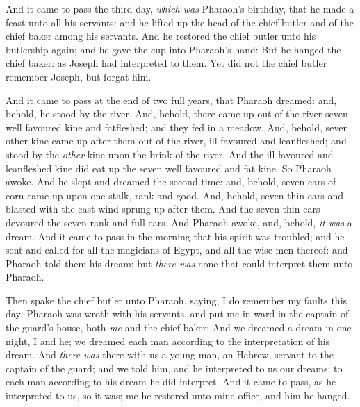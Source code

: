 \documentclass[11pt,letterpaper,oneside]{memoir}
\begin{document}
And it came to pass the third day, \emph{which was} Pharaoh's birthday,
that he made a feast unto all his servants: and he lifted up the head of
the chief butler and of the chief baker among his servants. And he
restored the chief butler unto his butlership again; and he gave the cup
into Pharaoh's hand: But he hanged the chief baker: as Joseph had
interpreted to them. Yet did not the chief butler remember Joseph, but
forgat him.

And it came to pass at the end of two full years, that Pharaoh dreamed:
and, behold, he stood by the river. And, behold, there came up out of
the river seven well favoured kine and fatfleshed; and they fed in a
meadow. And, behold, seven other kine came up after them out of the
river, ill favoured and leanfleshed; and stood by the \emph{other} kine
upon the brink of the river. And the ill favoured and leanfleshed kine
did eat up the seven well favoured and fat kine. So Pharaoh awoke. And
he slept and dreamed the second time: and, behold, seven ears of corn
came up upon one stalk, rank and good. And, behold, seven thin ears and
blasted with the east wind sprung up after them. And the seven thin ears
devoured the seven rank and full ears. And Pharaoh awoke, and, behold,
\emph{it was} a dream. And it came to pass in the morning that his
spirit was troubled; and he sent and called for all the magicians of
Egypt, and all the wise men thereof: and Pharaoh told them his dream;
but \emph{there was} none that could interpret them unto Pharaoh.

Then spake the chief butler unto Pharaoh, saying, I do remember my
faults this day: Pharaoh was wroth with his servants, and put me in ward
in the captain of the guard's house, both \emph{me} and the chief baker:
And we dreamed a dream in one night, I and he; we dreamed each man
according to the interpretation of his dream. And \emph{there was} there
with us a young man, an Hebrew, servant to the captain of the guard; and
we told him, and he interpreted to us our dreams; to each man according
to his dream he did interpret. And it came to pass, as he interpreted to
us, so it was; me he restored unto mine office, and him he hanged.
\end{document}
